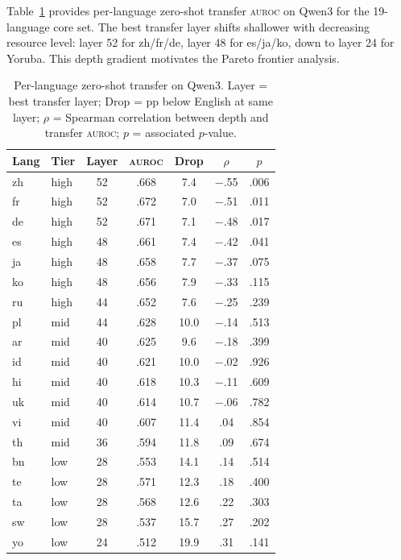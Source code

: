 \documentclass[11pt,a4paper]{article}
\newcommand{\auroc}{\textsc{auroc}}
\begin{document}
Table~\ref{tab:per_lang} provides per-language zero-shot transfer \auroc{} on Qwen3 for the 19-language core set. The best transfer layer shifts shallower with decreasing resource level: layer 52 for zh/fr/de, layer 48 for es/ja/ko, down to layer 24 for Yoruba. This depth gradient motivates the Pareto frontier analysis.

\begin{table}[t]
\centering
\small
\setlength{\tabcolsep}{3pt}
\begin{tabular}{@{}llccccc@{}}
\toprule
\textbf{Lang} & \textbf{Tier} & \textbf{Layer} & \textbf{\auroc{}} & \textbf{Drop} & \textbf{$\rho$} & \textbf{$p$} \\
\midrule
zh & high & 52 & .668 & 7.4 & $-$.55 & .006 \\
fr & high & 52 & .672 & 7.0 & $-$.51 & .011 \\
de & high & 52 & .671 & 7.1 & $-$.48 & .017 \\
es & high & 48 & .661 & 7.4 & $-$.42 & .041 \\
ja & high & 48 & .658 & 7.7 & $-$.37 & .075 \\
ko & high & 48 & .656 & 7.9 & $-$.33 & .115 \\
ru & high & 44 & .652 & 7.6 & $-$.25 & .239 \\
\midrule
pl & mid & 44 & .628 & 10.0 & $-$.14 & .513 \\
ar & mid & 40 & .625 & 9.6 & $-$.18 & .399 \\
id & mid & 40 & .621 & 10.0 & $-$.02 & .926 \\
hi & mid & 40 & .618 & 10.3 & $-$.11 & .609 \\
uk & mid & 40 & .614 & 10.7 & $-$.06 & .782 \\
vi & mid & 40 & .607 & 11.4 & .04 & .854 \\
th & mid & 36 & .594 & 11.8 & .09 & .674 \\
\midrule
bn & low & 28 & .553 & 14.1 & .14 & .514 \\
te & low & 28 & .571 & 12.3 & .18 & .400 \\
ta & low & 28 & .568 & 12.6 & .22 & .303 \\
sw & low & 28 & .537 & 15.7 & .27 & .202 \\
yo & low & 24 & .512 & 19.9 & .31 & .141 \\
\bottomrule
\end{tabular}
\caption{Per-language zero-shot transfer on Qwen3. Layer = best transfer layer; Drop = pp below English at same layer; $\rho$ = Spearman correlation between depth and transfer \auroc{}; $p$ = associated $p$-value.}
\label{tab:per_lang}
\end{table}
\end{document}
